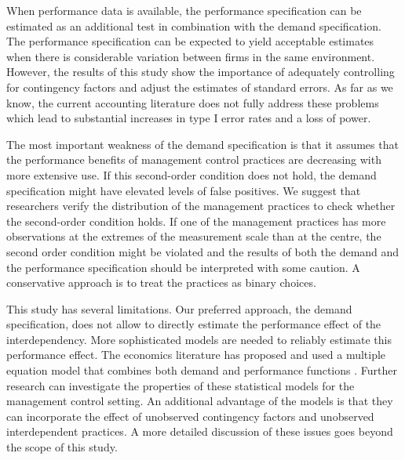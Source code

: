\documentclass[12pt]{article}
\begin{document}
When performance data is available, the performance specification can be estimated as an additional test in combination with the demand specification. The performance specification can be expected to yield acceptable estimates when there is considerable variation between firms in the same environment. However, the results of this study show the importance of adequately controlling for contingency factors and adjust the estimates of standard errors. As far as we know, the current accounting literature does not fully address these problems which lead to substantial increases in type I error rates and a loss of power.

The most important weakness of the demand specification is that it assumes that the performance benefits of management control practices are decreasing with more extensive use. If this second-order condition does not hold, the demand specification might have elevated levels of false positives. We suggest that researchers verify the distribution of the management practices to check whether the second-order condition holds. If one of the management practices has more observations at the extremes of the measurement scale than at the centre, the second order condition might be violated and the results of both the demand and the performance specification should be interpreted with some caution. A conservative approach is to treat the practices as binary choices. 

This study has several limitations.  Our preferred approach, the demand specification, does not allow to directly estimate the performance effect of the interdependency. More sophisticated models are needed to reliably estimate this performance effect. The economics literature has proposed and used a multiple equation model that combines both demand and performance functions \citep{athey_empirical_1998, gentzkow_valuing_2007, kretschmer_competitive_2012, miravete_innovation_2006}. Further research can investigate the properties of these statistical models for the management control setting. An additional advantage of the models is that they can incorporate the effect of unobserved contingency factors and unobserved interdependent practices. A more detailed discussion of these issues goes beyond the scope of this study.
\end{document}
